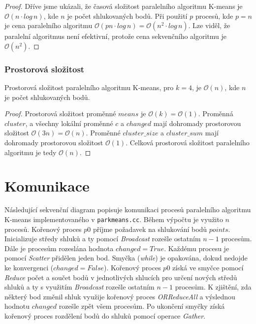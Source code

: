 \documentclass[a4paper, 11pt, fleqn]{scrartcl}
\begin{document}
        \begin{proof}
          Dříve jsme ukázali, že časová složitost paralelního algoritmu K-means je $\mathcal{O}(n\cdot log\, n)$, kde $n$ je počet shlukovaných bodů. Při použití $p$ procesů, kde $p = n$ je cena paralelního algoritmu $\mathcal{O}(pn\cdot log\, n) = \mathcal{O}(n^2\cdot log\, n)$. Lze viděl, že paralelní algoritmus není efektivní, protože cena sekvenčního algoritmu je $\mathcal{O}(n^2)$.
        \end{proof}

      \subsubsection{Prostorová složitost}
        Prostorová složitost paralelního algoritmu K-means, pro $k = 4$, je $\mathcal{O}(n)$, kde $n$ je počet shlukovaných bodů.

        \begin{proof}
          Prostorová složitost proměnné $means$ je $\mathcal{O}(k) = \mathcal{O}(1)$. Proměnná $cluster$, a všechny lokální proměnné $c$ a $changed$ mají dohromady prostorovou složitost $\mathcal{O}(3n) = \mathcal{O}(n)$. Proměnné $cluster\_size$ a $cluster\_sum$ mají dohromady prostorovou složitost $\mathcal{O}(1)$. Celková prostorová složitost paralelního algoritmu je tedy $\mathcal{O}(n)$.
        \end{proof}

  \section{Komunikace}

    Následující sekvenční diagram popisuje komunikaci procesů paralelního algoritmu K-means implementovaného v \texttt{parkmeans.cc}. Během výpočtu je využito $n$ procesů. Kořenový proces $p0$ příjme požadavek na shlukování bodů $points$. Inicializuje středy shluků a ty pomocí \textit{Broadcast} rozešle ostatním $n-1$ procesům. Dále je procesům rozeslána hodnota $changed=True$. Každému procesu je pomocí \textit{Scatter} přidělen jeden bod. Smyčka (\textit{while}) je opakována, dokud nedojde ke konvergenci ($changed=False$). Kořenový proces $p0$ získá ve smyčce pomocí \textit{Reduce} počet a součet bodů v jednotlivých shlucích pro určení nových středů shluků a ty s využitím \textit{Broadcast} rozešle ostatním $n-1$ procesům. K zjištění, zda některý bod změnil shluk využije kořenový proces \textit{ORReduceAll} a výslednou hodnotu $changed$ rozešle zpět všem procesům. Po ukončení smyčky získá kořenový proces rozdělení bodů do shluků pomocí operace \textit{Gather}.
\end{document}

